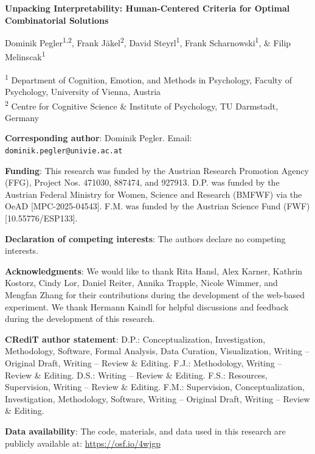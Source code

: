 \documentclass[12pt]{article}
\begin{document}
\begin{titlepage}
\centering

{\Large\bfseries Unpacking Interpretability: Human-Centered Criteria for Optimal Combinatorial Solutions\par}
\vspace{1.5cm}

{\large
Dominik Pegler\textsuperscript{1,2},
Frank Jäkel\textsuperscript{2},
David Steyrl\textsuperscript{1},
Frank Scharnowski\textsuperscript{1}, \& 
Filip Melinscak\textsuperscript{1}\par
}

\vspace{1cm}

\raggedright
\textsuperscript{1} Department of Cognition, Emotion, and Methods in Psychology, Faculty of Psychology, University of Vienna, Austria\\
\textsuperscript{2} Centre for Cognitive Science \& Institute of Psychology, TU Darmstadt, Germany

\vspace{1cm}

\textbf{Corresponding author}: Dominik Pegler. Email: \texttt{dominik.pegler@univie.ac.at}

\vspace{0.5cm}

\textbf{Funding}: This research was funded by the Austrian Research Promotion Agency (FFG), Project Nos. 471030, 887474, and 927913. D.P. was funded by the Austrian Federal Ministry for Women, Science and Research (BMFWF) via the OeAD [MPC-2025-04543]. F.M. was funded by the Austrian Science Fund (FWF) [10.55776/ESP133].

\vspace{0.5cm}

\textbf{Declaration of competing interests}: The authors declare no competing interests.

\vspace{0.5cm}

\textbf{Acknowledgments}: We would like to thank Rita Hansl, Alex Karner, Kathrin Kostorz, Cindy Lor, Daniel Reiter, Annika Trapple, Nicole Wimmer, and Mengfan Zhang for their contributions during the development of the web-based experiment. We thank Hermann Kaindl for helpful discussions and feedback during the development of this research.

\vspace{0.5cm}

\textbf{CRediT author statement}: D.P.: Conceptualization, Investigation, Methodology, Software, Formal Analysis, Data Curation, Visualization, Writing -- Original Draft, Writing -- Review \& Editing. F.J.: Methodology, Writing -- Review \& Editing. D.S.: Writing -- Review \& Editing. F.S.: Resources, Supervision, Writing -- Review \& Editing. F.M.: Supervision, Conceptualization, Investigation, Methodology, Software, Writing -- Original Draft, Writing -- Review \& Editing.

\vspace{0.5cm}

\textbf{Data availability}: The code, materials, and data used in this research are publicly available at: \url{https://osf.io/4wjgp}

\vfill
\end{titlepage}
\end{document}
